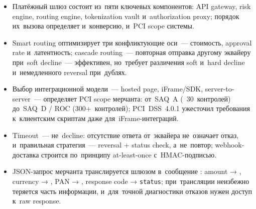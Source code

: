 \begin{itemize}
  \item Платёжный шлюз состоит из~пяти ключевых компонентов:
        API gateway, risk engine, routing engine, tokenization vault
        и~authorization proxy; порядок их~вызова определяет
        и~конверсию, и~PCI scope системы.
  \item Smart routing оптимизирует три конфликтующие оси~---
        стоимость, approval rate и~латентность; cascade routing~---
        повторная отправка другому эквайеру при~soft decline~---
        эффективен, но~требует различения soft и~hard decline
        и~немедленного reversal при~дублях.
  \item Выбор интеграционной модели~--- hosted page, iFrame/SDK,
        server-to-server~--- определяет PCI scope мерчанта:
        от~SAQ~A (~30~контролей) до~SAQ~D / ROC (300+~контролей);
        PCI~DSS~4.0.1 ужесточил требования к~клиентским скриптам
        даже для~iFrame-интеграций.
  \item Timeout~--- не~decline: отсутствие ответа от~эквайера
        не~означает отказ, и~правильная стратегия~--- reversal
        + status check, а~не~повтор; webhook-доставка строится
        по~принципу at-least-once с~HMAC-подписью.
  \item JSON-запрос мерчанта транслируется шлюзом в~сообщение
        : amount → , currency → ,
        PAN → , response code  → \texttt{status};
        при~трансляции неизбежно теряется часть информации,
        и~для~точной диагностики отказов нужен доступ к~raw
        response.
\end{itemize}
